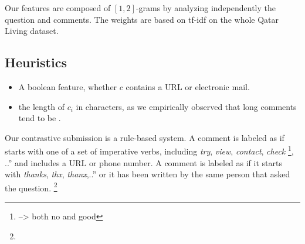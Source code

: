 Our features are composed of $[1,2]$-grams by analyzing independently the 
question and comments. The weights are based on tf-idf on the whole Qatar 
Living 
dataset. 

\subsection{Heuristics}
\label{ssub:heuristics}

\begin{itemize}
 \item A boolean feature, whether $c$ contains a URL or electronic mail. 
 \item the length of $c_i$ in characters, as we empirically observed that long 
  comments tend to be \good.
\end{itemize}


Our contrastive submission  is a rule-based system. A comment is 
labeled as \good if starts with one of a set of imperative verbs, including 
\textit{try}, \textit{view}, \textit{contact}, \textit{check}%
\footnote{
 --> both no and good


% 
% 


}, ..” and includes a URL or phone number. A comment is labeled 
as \dial if it starts with \textit{thanks}, \textit{thx}, \textit{thanx},..” 
or it has been written by the same person that asked the question.%
\footnote{}



